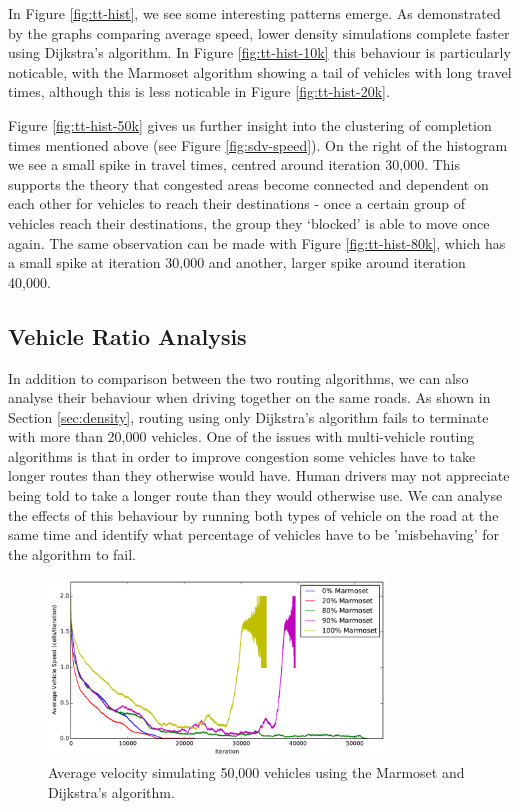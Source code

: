 \documentclass[ %
                    author={Alexander Hill},
                supervisor={Dr. Benjamin Sach},
                    degree={MEng},
                     title={MARMOSET},
                  subtitle={Multi-Agent Route Management using Online Simulation for Efficient Transportation},
                      type={research},
                      year={2016} ]{dissertation}
\begin{document}
In Figure \ref{fig:tt-hist}, we see some interesting patterns emerge. As
demonstrated by the graphs comparing average speed, lower density simulations
complete faster using Dijkstra's algorithm. In Figure \ref{fig:tt-hist-10k}
this behaviour is particularly noticable, with the Marmoset algorithm showing a
tail of vehicles with long travel times, although this is less noticable in
Figure \ref{fig:tt-hist-20k}.

Figure \ref{fig:tt-hist-50k} gives us further insight into the clustering of
completion times mentioned above (see Figure \ref{fig:sdv-speed}). On the
right of the histogram we see a small spike in travel times, centred around
iteration 30,000. This supports the theory that congested areas become
connected and dependent on each other for vehicles to reach their destinations -
once a certain group of vehicles reach their destinations, the group they
`blocked' is able to move once again. The same observation can be made with
Figure \ref{fig:tt-hist-80k}, which has a small spike at iteration 30,000 and
another, larger spike around iteration 40,000.

\subsection{Vehicle Ratio Analysis}

In addition to comparison between the two routing algorithms, we can also
analyse their behaviour when driving together on the same roads. As shown in
Section \ref{sec:density}, routing using only Dijkstra's algorithm fails to
terminate with more than 20,000 vehicles. One of the issues with multi-vehicle
routing algorithms is that in order to improve congestion some vehicles have to
take longer routes than they otherwise would have. Human drivers may not
appreciate being told to take a longer route than they would otherwise use. We
can analyse the effects of this behaviour by running both types of vehicle on
the road at the same time and identify what percentage of vehicles have to be
'misbehaving' for the algorithm to fail.

\begin{figure}[h]
    \centering
    \includegraphics[width=0.8\textwidth]{ratio-av.pdf}
    \caption{Average velocity simulating 50,000 vehicles using the Marmoset and Dijkstra's algorithm.}\label{fig:ratio-av}
\end{figure}
\end{document}
